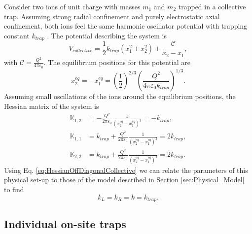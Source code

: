 Consider two ions of unit charge with masses $m_1$ and $m_2$ trapped in a collective trap. Assuming strong radial confinement and purely electrostatic axial confinement, both ions feel the same harmonic oscillator potential with trapping constant $k_{trap}$ \cite{Leibfried2003}. The potential describing the system is
%
\begin{equation}
  V_{collective} = \frac{1}{2}k_{trap} \left( x_1^2 + x_2^2\right) + \frac{\mathcal{C}}{x_2-x_1},
\end{equation}
%
with $\mathcal{C}=\frac{Q^2}{4\pi\varepsilon_0}$. The equilibrium positions for this potential are
%
\begin{equation}
  x_2^{eq} = -x_1^{eq} =
  \label{eq:equilibriumPositionsCollectiveTrap}\left(\frac{1}{2}\right)^{2/3} \left(\frac{Q^2}{4\pi\varepsilon_0 k_{trap}}\right)^{1/3}.
\end{equation}
%
Assuming small oscillations of the ions around the equilibrium positions, the Hessian matrix of the system is
%
\begin{align}
  \mathbb{K}_{1,2} &= -\frac{Q^2}{2\pi\varepsilon_0}\frac{1}{(x_2^{eq}-x_1^{eq})^3} = -k_{trap},\nonumber
  \\
  \mathbb{K}_{1,1} &= k_{trap} + \frac{Q^2}{2\pi\varepsilon_0}\frac{1}{(x_2^{eq}-x_1^{eq})^3} = 2 k_{trap},\nonumber
  \\
  \mathbb{K}_{2,2} &= k_{trap} + \frac{Q^2}{2\pi\varepsilon_0}\frac{1}{(x_2^{eq}-x_1^{eq})^3} = 2 k_{trap}.
  \label{eq:HessianOffDiagonalCollective}
\end{align}
%
Using Eq. \eqref{eq:HessianOffDiagonalCollective} we can relate the parameters of this physical set-up to those of the model described in Section \ref{sec:Physical_Model} to find
%
\begin{equation}
  k_L = k_R = k = k_{trap}.
\end{equation}
%

\subsection{Individual on-site traps}

